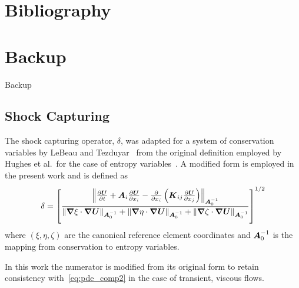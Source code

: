 \documentclass[compress,11pt]{beamer}
\begin{document}
\section{Bibliography}
\begin{frame}[allowframebreaks]{}
  
  \vspace{-1em}
  \tiny
  
  \normalsize
\end{frame}

\section{Backup}
\frame
{
  \vspace{4em}
  \centerline{\Huge{Backup}}
}



\subsection{Shock Capturing}
\frame
{
  \small
  The shock capturing operator, $\delta$, was adapted for a system of conservation variables by LeBeau and Tezduyar~\cite{gjlebeau_thesis,skaliabadi_dissertation,aliabadi_tezduyar_IJNMF_1995} from the original definition employed by Hughes et al.\ for the case of entropy variables~\cite{hughes_shock_capturing,shakib_hughes_ns}.  A modified form is employed in the present work and is defined as
\begin{equation}
  \label{eq:shock_capturing_parameter}
  \delta = \left[\frac{\left\|{\frac{\partial{{\boldsymbol{U}}}}{\partial{t}}} + {\boldsymbol{A}}_i{\frac{\partial{{\boldsymbol{U}}}}{\partial{x_i}}}
                       - {\frac{\partial{}}{\partial{x_i}}} \left( {\boldsymbol{K}}_{ij} {\frac{\partial{{\boldsymbol{U}}}}{\partial{x_j}}} \right)\right\|_{{\boldsymbol{A}}_0^{-1}}}
                      {\|{\boldsymbol{\nabla}} {\xi}  \cdot{\boldsymbol{\nabla}} {{\boldsymbol{U}}}\|_{{\boldsymbol{A}}_0^{-1}} +
		       \|{\boldsymbol{\nabla}} {\eta} \cdot{\boldsymbol{\nabla}} {{\boldsymbol{U}}}\|_{{\boldsymbol{A}}_0^{-1}} +
		       \|{\boldsymbol{\nabla}} {\zeta}\cdot{\boldsymbol{\nabla}} {{\boldsymbol{U}}}\|_{{\boldsymbol{A}}_0^{-1}}}\right]^{1/2}
\end{equation}
where $\left(\xi,\eta,\zeta\right)$ are the canonical reference element coordinates and ${\boldsymbol{A}}_0^{-1}$ is the mapping from conservation to entropy variables.
\vspace{.5em}

In this work the numerator is modified from its original form to retain consistency with~\eqref{eq:pde_comp2} in the case of transient, viscous flows.
}
\end{document}

